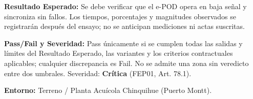 \par\noindent\textbf{Resultado Esperado:} Se debe verificar que el e-POD opera en baja señal y sincroniza sin fallos. Los tiempos, porcentajes y magnitudes observados se registrarán después del ensayo; no se anticipan mediciones ni actas suscritas.\par
\par\noindent\textbf{Pass/Fail y Severidad:} Pass únicamente si se cumplen todas las salidas y límites del Resultado Esperado, las variantes y los criterios contractuales aplicables; cualquier discrepancia es Fail. No se admite una zona sin veredicto entre dos umbrales. Severidad: \textbf{Crítica} (FEP01, Art. 78.1).\par
\par\noindent\textbf{Entorno:} Terreno / Planta Acuícola Chinquihue (Puerto Montt).\par





\endgroup
